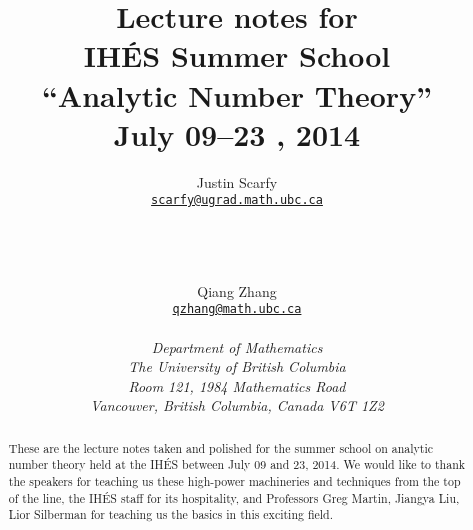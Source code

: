 \documentclass[12pt,amsfont]{amsart}
\begin{document}
\newtheorem{theorem}{Theorem}[section]
\newtheorem{lem}[theorem]{Lemma}
\newtheorem{pbm}[theorem]{Problem}
\newtheorem{pro}[theorem]{Proposition}
\newtheorem{cor}[theorem]{Corollary}
\newtheorem{cnj}[theorem]{Conjecture}
\newtheorem{dfn}[theorem]{Definition}
\newtheorem{thm}[theorem]{Theorem}
\newtheorem{rmk}[theorem]{Remark}
\newtheorem{xmp}[theorem]{Example}
\newtheorem{exe}[theorem]{Exercise}
\newenvironment{solution}
               {\let\oldqedsymbol=\qedsymbol
                \renewcommand{\qedsymbol}{$\blacktriangle$}
                \begin{proof}[\bf Solution]} 
               {\end{proof}
                \renewcommand{\qedsymbol}{\oldqedsymbol}}
                

\title{\bf Lecture notes for\\ IH\'{E}S Summer School\\``Analytic Number Theory''\\ July 09--23 , 2014}
\author{Justin Scarfy \\ \href{mailto:scarfy@ugrad.math.ubc.ca}{
{\texttt{\lowercase{scarfy@ugrad.math.ubc.ca}}} }
 \\ \\ \and \\ \\ Qiang	Zhang\\
\href{mailto:qzhang@math.ubc.ca}{
{\texttt{\lowercase{qzhang@math.ubc.ca}}} }
\\
\\
{\textnormal{\textit{D{\lowercase{epartment of }}M{\lowercase{athematics}}\\ T\lowercase{he} U\lowercase{niversity of} B\lowercase{ritish} C\lowercase{olumbia}\\ R\lowercase{oom} 121, 1984 M\lowercase{athematics} R\lowercase{oad}\\V\lowercase{ancouver}, B\lowercase{ritish} C\lowercase{olumbia}, C\lowercase{anada} V6T 1Z2}}}}
\begin{abstract}
These are the lecture notes taken and polished for the summer school on analytic number theory held at the IH\'{E}S between July 09 and 23, 2014.  We would like to thank the speakers for teaching us these high-power machineries and techniques from the top of the line, the IH\'{E}S staff for its hospitality, and Professors Greg Martin, Jiangya Liu, Lior Silberman for teaching us the basics in this exciting field.
\end{abstract}
\end{document}
